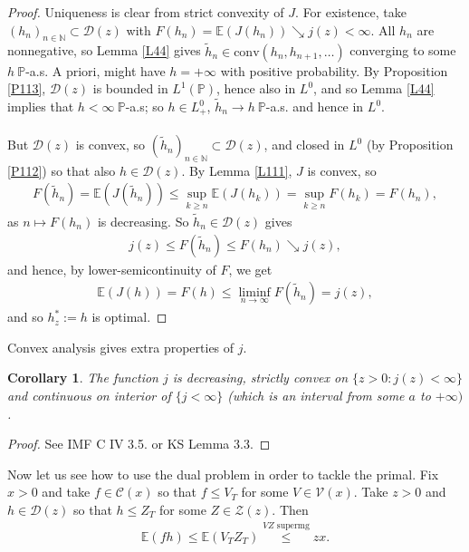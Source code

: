 \documentclass[12pt,a4paper, twoside]{article}
\newtheorem{cor}{Corollary}[section]
\theoremstyle{definition}
\newcommand{\EE}{\mathbb{E}} %
\newcommand{\PP}{\mathbb{P}} %
\begin{document}
\begin{proof}
Uniqueness is clear  from strict convexity of $J$. For existence, take $(h_n)_{n \in \mathbb{N}} \subset \mathcal{D}(z)$ with $F(h_n)= \EE(J(h_n)) \searrow j(z) < \infty$. All $h_n$ are nonnegative, so Lemma \ref{L44} gives $\widetilde{h}_n \in \text{conv}(h_n, h_{n+1}, \dots )$ converging to some $h \ \PP$-a.s. A priori, might have $h= + \infty$ with positive probability. By Proposition \ref{P113}, $\mathcal{D}(z)$ is bounded in $L^1( \PP)$, hence also in $L^0$, and so Lemma \ref{L44} implies that $h < \infty \ \PP$-a.s; so $h \in L_+^0$, $\widetilde{h}_n \to h \ \PP$-a.s. and hence in $L^0$. \\
\\
But $\mathcal{D}(z)$ is convex, so $(\widetilde{h}_n)_{n \in \mathbb{N}} \subset \mathcal{D}(z)$, and closed in $L^0$ (by Proposition \ref{P112}) so that also $h \in \mathcal{D}(z)$. By Lemma \ref{L111}, $J$ is convex, so
\begin{align*}
F( \widetilde{h}_n) = \EE(J( \widetilde{h}_n)) \leq \sup_{k \geq n} \EE(J(h_k)) = \sup_{k \geq n } F(h_k) = F(h_n),
\end{align*}
as $n \mapsto F(h_n)$ is decreasing. So $\widetilde{h}_n \in \mathcal{D}(z)$ gives 
\begin{align*}
j(z) \leq F( \widetilde{h}_n) \leq F(h_n) \searrow j(z),
\end{align*}
and hence, by lower-semicontinuity of $F$, we get
\begin{align*}
\EE(J(h)) = F(h) \leq \liminf_{n \to \infty} F( \widetilde{h}_n) = j(z),
\end{align*}
and so $h_z^* := h$ is optimal. 
\end{proof}
Convex analysis gives extra properties of $j$.
\begin{cor} \label{C115} The function $j$ is decreasing, strictly convex on $\{ z >0: j(z) < \infty\}$ and continuous on interior of $\{j < \infty\}$ (which is an interval from some $a$ to $+ \infty)$.
\end{cor}
\begin{proof}
See IMF C IV 3.5. or KS Lemma 3.3.
\end{proof}
Now let us see how to use the dual problem in order to tackle the primal. Fix $x>0$ and take $f \in \mathcal{C}(x)$ so that $f \leq V_T$ for some $V \in \mathcal{V}(x)$. Take $z>0$ and $h \in \mathcal{D}(z)$ so that $h \leq Z_T$ for some $Z \in \mathcal{Z}(z)$. Then 
\begin{align*}
\EE(fh) \leq \EE(V_T Z_T) \overset{VZ \text{ supermg}}\leq zx.
\end{align*}
\end{document}
